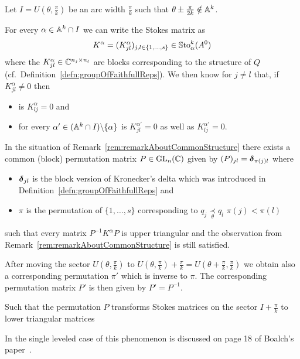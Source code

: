 Let $I=U(\theta,\frac{\pi}{k})$ be an arc width $\frac{\pi}{k}$ such that
$\theta\pm\frac{\pi}{2k}\notin\mathbb{A}^k$.
\begin{rem}\label{rem:remarkAboutCommonStructure}
  For every $\alpha\in\mathbb{A}^k\cap I$ we can write the Stokes matrix as
  \[
    K^\alpha=(K^\alpha_{jl})_{j,l\in\{1,\dots,s\}}\in\operatorname{\mathbb{S}to}_\alpha^k(A^0)
  \]
  where the $K^\alpha_{jl}\in\mathbb{C}^{n_j\times n_l}$ are blocks corresponding to
  the structure of $Q$ (cf.\ Definition~\ref{defn:groupOfFaithfullReps}).
  We then know for $j\neq l$ that, if $K^\alpha_{jl}\neq0$ then
  \begin{itemize}
    \item is $K^\alpha_{lj}=0$ and
    \item for every $\alpha'\in(\mathbb{A}^k\cap I)\backslash\{\alpha\}$ is
      $K^{\alpha'}_{jl}=0$ as well as $K^{\alpha'}_{lj}=0$.
  \end{itemize}
\end{rem}
\begin{rem}
  In the situation of Remark~\ref{rem:remarkAboutCommonStructure}
  there exists a common (block) permutation matrix $P\in\operatorname{GL}_n(\mathbb{C})$ given by
  $(P)_{jl}=\boldsymbol{\delta}_{\pi(j)l}$ where
  \begin{itemize}
    \item $\boldsymbol{\delta}_{jl}$ is the block version of Kronecker's delta
      which was introduced in Definition~\ref{defn:groupOfFaithfullReps} and
    \item $\pi$ is the permutation of $\{1,\dots,s\}$ corresponding to
      $q_j\underset{\theta}{\prec}q_l$ \Leftrightarrow{} $\pi(j)<\pi(l)$
  \end{itemize}
  such that every matrix $P^{-1}K^{\alpha}P$ is upper triangular and the
  observation from Remark~\ref{rem:remarkAboutCommonStructure} is still
  satisfied.
  \begin{s-rem}
    After moving the sector $U(\theta,\frac{\pi}{k})$ to
    $U(\theta,\frac{\pi}{k})+\frac{\pi}{k}
    =U(\theta+\frac{\pi}{k},\frac{\pi}{k})$ we obtain also a corresponding
    permutation $\pi'$ which is inverse to $\pi$.
    The corresponding permutation matrix $P'$ is then given by $P'=P^{-1}$.

    Such that the permutation $P$ transforms Stokes matrices on the sector
    $I+\frac{\pi}{k}$ to lower triangular matrices
  \end{s-rem}
  In the single leveled case of this phenomenon is discussed on page 18 of
  Boalch's paper~\cite{boalch}.
\end{rem}

